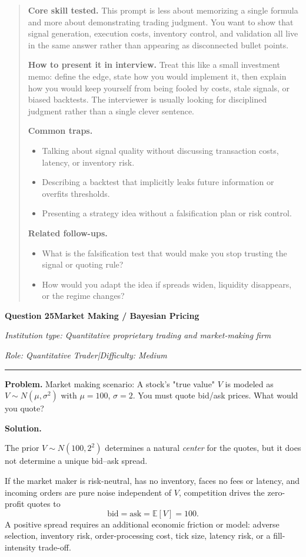 \documentclass[11pt,letterpaper,openany]{book}
\newenvironment{EditorialNote}
  {\begin{quote}\small\setlength{\parskip}{0.25em}}
  {\end{quote}}
\newcommand{\QuestionSpacer}{\vspace{0.4em}}
\newcommand{\InterviewQuestionHeader}[5]{%
  \vspace{1.0em}%
  {\large\bfseries #1\enspace #4\par}%
  {\small\itshape Institution type: #2\par}%
  {\small\itshape Role: #3\enspace |\enspace Difficulty: #5\par}%
  \vspace{0.25em}\hrule\vspace{0.45em}%
}
\begin{document}
\begin{EditorialNote}


\textbf{Core skill tested.} This prompt is less about memorizing a single formula and more about demonstrating trading judgment. You want to show that signal generation, execution costs, inventory control, and validation all live in the same answer rather than appearing as disconnected bullet points.

\textbf{How to present it in interview.} Treat this like a small investment memo: define the edge, state how you would implement it, then explain how you would keep yourself from being fooled by costs, stale signals, or biased backtests. The interviewer is usually looking for disciplined judgment rather than a single clever sentence.

\textbf{Common traps.}
\begin{itemize}
\item Talking about signal quality without discussing transaction costs, latency, or inventory risk.
\item Describing a backtest that implicitly leaks future information or overfits thresholds.
\item Presenting a strategy idea without a falsification plan or risk control.
\end{itemize}

\textbf{Related follow-ups.}
\begin{itemize}
\item What is the falsification test that would make you stop trusting the signal or quoting rule?
\item How would you adapt the idea if spreads widen, liquidity disappears, or the regime changes?
\end{itemize}


\end{EditorialNote}
\QuestionSpacer

\InterviewQuestionHeader{Question 25}{Quantitative proprietary trading and market-making firm}{Quantitative Trader}{Market Making / Bayesian Pricing}{Medium}
\textbf{Problem.} Market making scenario: A stock's "true value" \(V\) is modeled as \(V \sim N(\mu,\sigma^2)\) with \(\mu=100\), \(\sigma=2\). You must quote bid/ask prices. What would you quote?

\textbf{Solution.}


The prior \(V\sim N(100,2^2)\) determines a natural \emph{center} for the quotes, but it does not determine a unique bid--ask spread.

If the market maker is risk-neutral, has no inventory, faces no fees or latency, and incoming orders are pure noise independent of \(V\), competition drives the zero-profit quotes to
\[
\text{bid}=\text{ask}=\mathbb E[V]=100.
\]
A positive spread requires an additional economic friction or model: adverse selection, inventory risk, order-processing cost, tick size, latency risk, or a fill-intensity trade-off.
\end{document}
